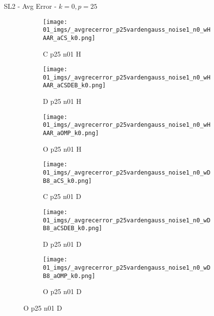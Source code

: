 \begin{frame}{SL2 - Avg Error - $k=0,p=25$}{}
\begin{figure}
\begin{subfigure}{0.13\textwidth}
\texttt{[image: 01\_imgs/\_avgrecerror\_p25vardengauss\_noise1\_n0\_wHAAR\_aCS\_k0.png]}
\caption*{\tiny C p25 n01 H}
\end{subfigure}
\begin{subfigure}{0.13\textwidth}
\texttt{[image: 01\_imgs/\_avgrecerror\_p25vardengauss\_noise1\_n0\_wHAAR\_aCSDEB\_k0.png]}
\caption*{\tiny D p25 n01 H}
\end{subfigure}
\begin{subfigure}{0.13\textwidth}
\texttt{[image: 01\_imgs/\_avgrecerror\_p25vardengauss\_noise1\_n0\_wHAAR\_aOMP\_k0.png]}
\caption*{\tiny O p25 n01 H}
\end{subfigure}
\begin{subfigure}{0.13\textwidth}
\texttt{[image: 01\_imgs/\_avgrecerror\_p25vardengauss\_noise1\_n0\_wDB8\_aCS\_k0.png]}
\caption*{\tiny C p25 n01 D}
\end{subfigure}
\begin{subfigure}{0.13\textwidth}
\texttt{[image: 01\_imgs/\_avgrecerror\_p25vardengauss\_noise1\_n0\_wDB8\_aCSDEB\_k0.png]}
\caption*{\tiny D p25 n01 D}
\end{subfigure}
\begin{subfigure}{0.13\textwidth}
\texttt{[image: 01\_imgs/\_avgrecerror\_p25vardengauss\_noise1\_n0\_wDB8\_aOMP\_k0.png]}
\caption*{\tiny O p25 n01 D}
\end{subfigure}

\vspace{5pt}


\end{figure}
\end{frame}
